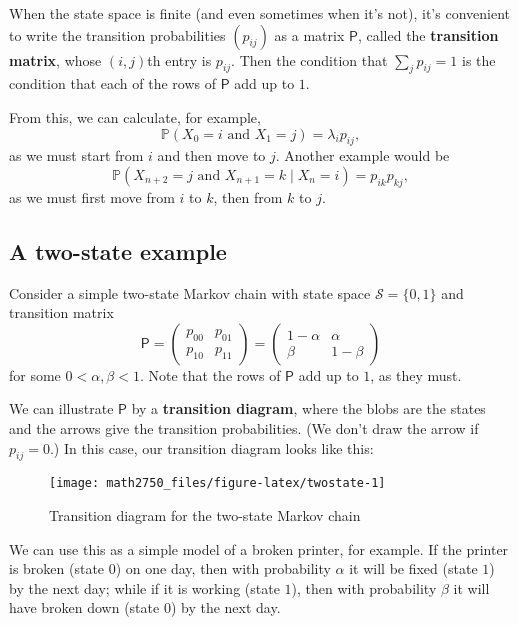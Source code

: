 \documentclass[
  a4paper,
]{article}
\theoremstyle{definition}
\theoremstyle{definition}
\theoremstyle{definition}
\theoremstyle{remark}
\begin{document}
When the state space is finite (and even sometimes when it's not), it's convenient to write the transition probabilities \((p_{ij})\) as a matrix \(\mathsf P\), called the \textbf{transition matrix}, whose \((i,j)\)th entry is \(p_{ij}\). Then the condition that \(\sum_j p_{ij} = 1\) is the condition that each of the rows of \(\mathsf P\) add up to \(1\).

From this, we can calculate, for example,
\[ \mathbb P(X_0 = i \text{ and } X_1 = j) = \lambda_i p_{ij} , \]
as we must start from \(i\) and then move to \(j\). Another example would be
\[ \mathbb P(X_{n+2} = j \text{ and } X_{n+1} = k \mid X_n = i) = p_{ik}p_{kj} , \]
as we must first move from \(i\) to \(k\), then from \(k\) to \(j\).

\hypertarget{S05-example}{%
\subsection{A two-state example}\label{S05-example}}

Consider a simple two-state Markov chain with state space \(\mathcal S = \{0,1\}\) and transition matrix
\[ \mathsf P = \begin{pmatrix} p_{00} & p_{01} \\ p_{10} & p_{11} \end{pmatrix} = \begin{pmatrix} 1-\alpha & \alpha \\ \beta & 1-\beta \end{pmatrix}  \]
for some \(0 < \alpha, \beta < 1\). Note that the rows of \(\mathsf P\) add up to \(1\), as they must.

We can illustrate \(\mathsf P\) by a \textbf{transition diagram}, where the blobs are the states and the arrows give the transition probabilities. (We don't draw the arrow if \(p_{ij} = 0\).) In this case, our transition diagram looks like this:

\begin{figure}

{\centering \texttt{[image: math2750\_files/figure-latex/twostate-1]} 

}

\caption{Transition diagram for the two-state Markov chain}\label{fig:twostate}
\end{figure}

We can use this as a simple model of a broken printer, for example. If the printer is broken (state \(0\)) on one day, then with probability \(\alpha\) it will be fixed (state \(1\)) by the next day; while if it is working (state \(1\)), then with probability \(\beta\) it will have broken down (state \(0\)) by the next day.
\end{document}
